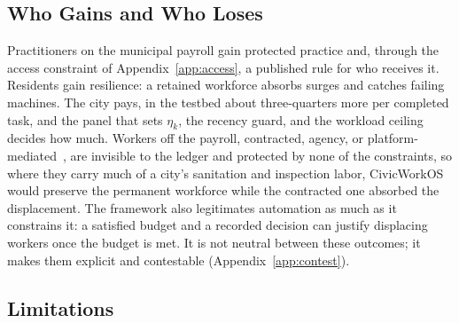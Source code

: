 \documentclass[utf8]{FrontiersinHarvard}
\begin{document}
	\subsection{Who Gains and Who Loses}
	\label{sec:whowins}

	Practitioners on the municipal payroll gain protected practice and, through the access constraint of Appendix~\ref{app:access}, a published rule for who receives it. Residents gain resilience: a retained workforce absorbs surges and catches failing machines. The city pays, in the testbed about three-quarters more per completed task, and the panel that sets $\eta_k$, the recency guard, and the workload ceiling decides how much. Workers off the payroll, contracted, agency, or platform-mediated~\citep{DeStefano2016,Wood2019}, are invisible to the ledger and protected by none of the constraints, so where they carry much of a city's sanitation and inspection labor, CivicWorkOS would preserve the permanent workforce while the contracted one absorbed the displacement. The framework also legitimates automation as much as it constrains it: a satisfied budget and a recorded decision can justify displacing workers once the budget is met. It is not neutral between these outcomes; it makes them explicit and contestable (Appendix~\ref{app:contest}).

	\subsection{Limitations}
	\label{sec:limitations}
\end{document}
